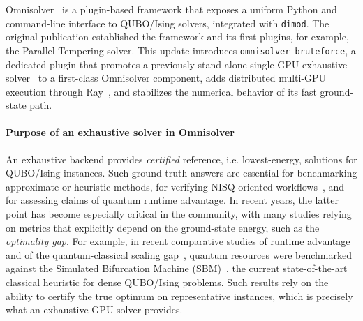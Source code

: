 \documentclass[preprint,12pt,a4paper]{elsarticle}
\begin{document}
Omnisolver~\cite{jalowiecki2021omnisolver} is a plugin-based framework that
exposes a uniform Python and command-line interface to QUBO/Ising solvers,
integrated with \texttt{dimod}. The original publication established the
framework and its first plugins, for example, the Parallel Tempering solver. This update introduces
\texttt{omnisolver-bruteforce}, a dedicated plugin that promotes a previously
stand-alone single-GPU exhaustive solver~\cite{jalowiecki2021brute} to a
first-class Omnisolver component, adds distributed multi-GPU execution
through Ray~\cite{DBLP:journals/corr/abs-1712-05889}, and stabilizes the
numerical behavior of its fast ground-state path.

\paragraph{Purpose of an exhaustive solver in Omnisolver}
An exhaustive backend provides \emph{certified} reference, i.e. lowest-energy,
solutions for QUBO/Ising instances. Such ground-truth answers are essential for
benchmarking approximate or heuristic methods, for verifying NISQ-oriented
workflows~\cite{preskill2018quantum}, and for assessing claims of quantum
runtime advantage. In recent years, the latter point has become especially
critical in the community, with many studies relying on metrics that
explicitly depend on the ground-state energy, such as the \emph{optimality gap}.
For example, in recent comparative studies of runtime
advantage~\cite{tuziemski2026limits} and of the quantum-classical scaling
gap~\cite{pawlowski2025closing}, quantum resources were benchmarked against the
Simulated Bifurcation Machine
(SBM)~\cite{goto2016bifurcation,goto2019combinatorial,goto2021high,pawlowski2026sbqa},
the current state-of-the-art classical heuristic for dense QUBO/Ising problems.
Such results rely on the ability to certify the true optimum on representative
instances, which is precisely what an exhaustive GPU solver provides.
\end{document}
